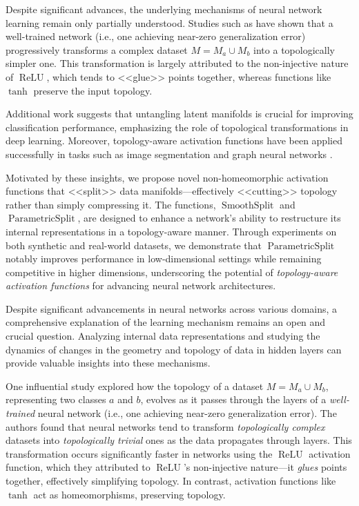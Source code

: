 \documentclass{esannV2}
\DeclareMathOperator{\relu}{\mathrm{ReLU}}
\DeclareMathOperator{\smoothsplit}{\mathrm{SmoothSplit}}
\DeclareMathOperator{\parametricsplit}{\mathrm{ParametricSplit}}
\begin{document}
Despite significant advances, the underlying mechanisms of neural network learning remain only partially understood.
Studies such as \cite{top_of_DNN} have shown that a well-trained network (i.e., one achieving near-zero generalization error) progressively transforms a complex dataset \(M = M_a \cup M_b\) into a topologically simpler one.
This transformation is largely attributed to the non-injective nature of \(\relu\), which tends to <<glue>> points together, whereas functions like \(\tanh\) preserve the input topology.

Additional work \cite{why_DL_works, sep_and_geo, activation_lands, magai2023deep} suggests that untangling latent manifolds is crucial for improving classification performance, emphasizing the role of topological transformations in deep learning.
Moreover, topology-aware activation functions have been applied successfully in tasks such as image segmentation \cite{baxter:hal-03001770} and graph neural networks \cite{9231732}.

Motivated by these insights, we propose novel non-homeomorphic activation functions that <<split>> data manifolds---effectively <<cutting>> topology rather than simply compressing it. The functions, \( \smoothsplit \) and \( \parametricsplit \), are designed to enhance a network’s ability to restructure its internal representations in a topology-aware manner.
Through experiments on both synthetic and real-world datasets, we demonstrate that \( \parametricsplit \) notably improves performance in low-dimensional settings while remaining competitive in higher dimensions, underscoring the potential of \textit{topology-aware activation functions} for advancing neural network architectures.

\iffalse
  Despite significant advancements in neural networks across various domains, a comprehensive explanation of the learning mechanism remains an open and crucial question.
  Analyzing internal data representations and studying the dynamics of changes in the geometry and topology of data in hidden layers can provide valuable insights into these mechanisms.

  One influential study \cite{top_of_DNN} explored how the topology of a dataset \( M = M_a \cup M_b \), representing two classes \( a \) and \( b \), evolves as it passes through the layers of a \textit{well-trained} neural network (i.e., one achieving near-zero generalization error).
  The authors found that neural networks tend to transform \textit{topologically complex} datasets into \textit{topologically trivial} ones as the data propagates through layers.
  This transformation occurs significantly faster in networks using the $\relu$ activation function, which they attributed to $\relu$'s non-injective nature—it \textit{glues} points together, effectively simplifying topology.
  In contrast, activation functions like $\tanh$ act as homeomorphisms, preserving topology.
\end{document}
